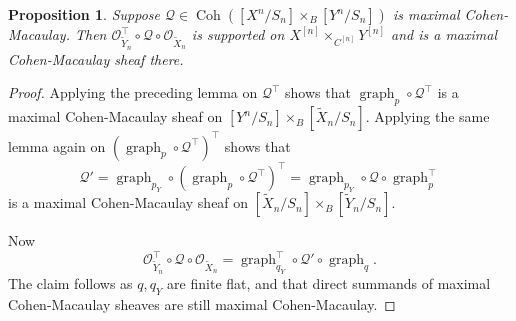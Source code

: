 \documentclass{amsart}
\theoremstyle{plain}
\newtheorem{proposition}[theorem]{Proposition}
\theoremstyle{definition}
\theoremstyle{remark}
\begin{document}
    \begin{proposition}\label{BKR_congruence}
        Suppose $\mathcal Q\in\operatorname{Coh}([X^n/S_n]\times_B[Y^n/S_n])$ is maximal Cohen-Macaulay.
        Then $\mathcal O_{\tilde{Y}_n}^\top\circ\mathcal Q\circ\mathcal O_{\tilde{X}_n}$ is supported on $X^{[n]}\times_{C^{[n]}}Y^{[n]}$ and is a maximal Cohen-Macaulay sheaf there.
    \end{proposition}
    \begin{proof}
        Applying the preceding lemma on $\mathcal Q^\top$ shows that $\operatorname{graph}_p\circ \mathcal Q^\top$ is a maximal Cohen-Macaulay sheaf on $[Y^n/S_n]\times_B[\tilde{X}_n/S_n]$.
        Applying the same lemma again on $(\operatorname{graph}_p\circ \mathcal Q^\top)^\top$ shows that
        \[\mathcal Q'=\operatorname{graph}_{p_Y}\circ(\operatorname{graph}_p\circ \mathcal Q^\top)^\top=\operatorname{graph}_{p_Y}\circ \mathcal Q\circ\operatorname{graph}_p^\top\]
        is a maximal Cohen-Macaulay sheaf on $[\tilde{X}_n/S_n]\times_B[\tilde{Y}_n/S_n]$.

        Now
        \[
        \mathcal O_{\tilde{Y}_n}^\top\circ\mathcal Q\circ\mathcal O_{\tilde{X}_n}=\operatorname{graph}_{q_Y}^\top\circ\mathcal Q'\circ\operatorname{graph}_q.
        \]
        The claim follows as $q,q_Y$ are finite flat, and that direct summands of maximal Cohen-Macaulay sheaves are still maximal Cohen-Macaulay.
    \end{proof}
\end{document}
